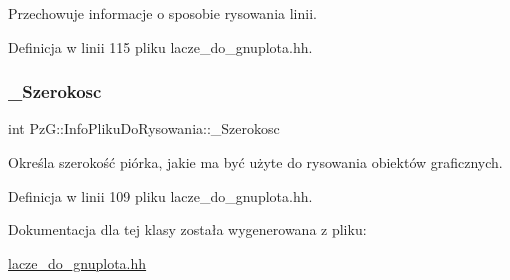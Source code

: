 Przechowuje informacje o sposobie rysowania linii. 

Definicja w linii 115 pliku lacze\+\_\+do\+\_\+gnuplota.\+hh.

\mbox{\label{class_pz_g_1_1_info_pliku_do_rysowania_a56a03dde7a7a414dbf3c230812a8d741}} 
\subsubsection{\texorpdfstring{\_Szerokosc}{\_Szerokosc}}
{\footnotesize\ttfamily int Pz\+G\+::\+Info\+Pliku\+Do\+Rysowania\+::\+\_\+\+Szerokosc\hspace{0.3cm}{\ttfamily [private]}}

Określa szerokość piórka, jakie ma być użyte do rysowania obiektów graficznych. 

Definicja w linii 109 pliku lacze\+\_\+do\+\_\+gnuplota.\+hh.



Dokumentacja dla tej klasy została wygenerowana z pliku\+:\begin{DoxyCompactItemize}
\item 
\mbox{\hyperlink{lacze__do__gnuplota_8hh}{lacze\+\_\+do\+\_\+gnuplota.\+hh}}\end{DoxyCompactItemize}
